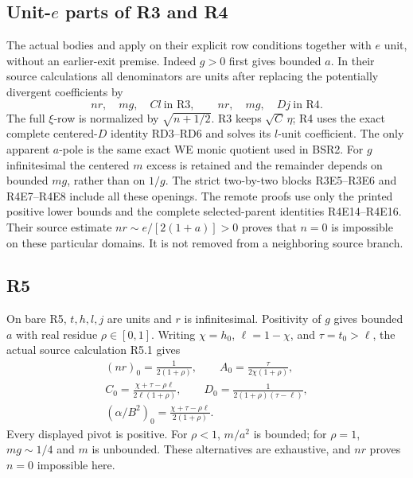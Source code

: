 \subsection{Unit-\(e\) parts of R3 and R4}

The actual bodies  and
 apply on their explicit
row conditions together with \(e\) unit, without an earlier-exit
premise.  Indeed \(g>0\) first gives bounded \(a\).  In their
source calculations all denominators are units after replacing
the potentially divergent coefficients by
\[
 nr,\quad mg,\quad Cl\ \text{in R3},\qquad
 nr,\quad mg,\quad Dj\ \text{in R4}.
 \tag{BSR4}
\]
The full \(\xi\)-row is normalized by \(\sqrt{n+1/2}\).
R3 keeps \(\sqrt C\,\eta\); R4 uses the exact complete
centered-\(D\) identity RD3--RD6 and solves its \(l\)-unit
coefficient.  The only apparent \(a\)-pole is the same exact
WE monic quotient used in BSR2.  For \(g\) infinitesimal
the centered \(m\) excess is retained and the remainder
depends on bounded \(mg\), rather than on \(1/g\).
The strict two-by-two blocks R3E5--R3E6 and
R4E7--R4E8 include all these openings.
The remote proofs use only the printed positive lower bounds
and the complete selected-parent identities R4E14--R4E16.
Their source estimate \(nr\sim e/[2(1+a)]>0\)
proves that \(n=0\) is impossible on these particular domains.
It is not removed from a neighboring source branch.

\subsection{R5}

On bare R5, \(t,h,l,j\) are units and \(r\) is
infinitesimal.  Positivity of \(g\) gives bounded \(a\)
with real residue \(\rho\in[0,1]\).
Writing \(\chi=h_0\), \(\ell=1-\chi\), and \(\tau=t_0>\ell\),
the actual source calculation R5.1 gives
\[
 \begin{gathered}
 (nr)_0=\frac1{2(1+\rho)},\qquad
 A_0=\frac{\tau}{2\chi(1+\rho)},\\
 C_0=\frac{\chi+\tau-\rho\ell}{2\ell(1+\rho)},\qquad
 D_0=\frac1{2(1+\rho)(\tau-\ell)},\\
 (\alpha/B^2)_0
       =\frac{\chi+\tau-\rho\ell}{2(1+\rho)}.
 \end{gathered}
 \tag{BSR5}
\]
Every displayed pivot is positive.  For \(\rho<1\),
\(m/a^2\) is bounded; for \(\rho=1\), \(mg\sim1/4\)
and \(m\) is unbounded.  These alternatives are exhaustive,
and \(nr\) proves \(n=0\) impossible here.

